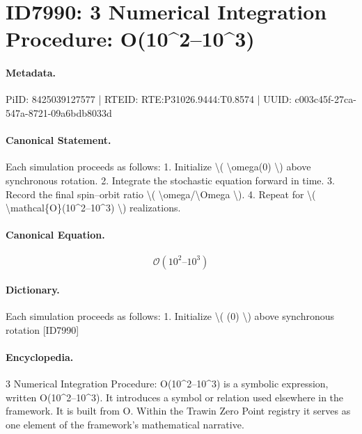 \section*{ID7990: 3 Numerical Integration Procedure: O(10\textasciicircum{}2–10\textasciicircum{}3)}
\paragraph{Metadata.}
PiID: 8425039127577 | RTEID: RTE:P31026.9444:T0.8574 | UUID: c003c45f-27ca-547a-8721-09a6bdb8033d

\paragraph{Canonical Statement.}
Each simulation proceeds as follows: 1. Initialize \textbackslash{}( \textbackslash{}omega(0) \textbackslash{}) above synchronous rotation. 2. Integrate the stochastic equation forward in time. 3. Record the final spin–orbit ratio \textbackslash{}( \textbackslash{}omega/\textbackslash{}Omega \textbackslash{}). 4. Repeat for \textbackslash{}( \textbackslash{}mathcal\{O\}(10\textasciicircum{}2–10\textasciicircum{}3) \textbackslash{}) realizations.

\paragraph{Canonical Equation.}
\[
\mathcal{O}(10^2–10^3)
\]

\paragraph{Dictionary.}
Each simulation proceeds as follows: 1. Initialize \textbackslash{}( (0) \textbackslash{}) above synchronous rotation [ID7990]

\paragraph{Encyclopedia.}
3 Numerical Integration Procedure: O(10\textasciicircum{}2–10\textasciicircum{}3) is a symbolic expression, written O(10\textasciicircum{}2–10\textasciicircum{}3). It introduces a symbol or relation used elsewhere in the framework. It is built from O. Within the Trawin Zero Point registry it serves as one element of the framework's mathematical narrative.
